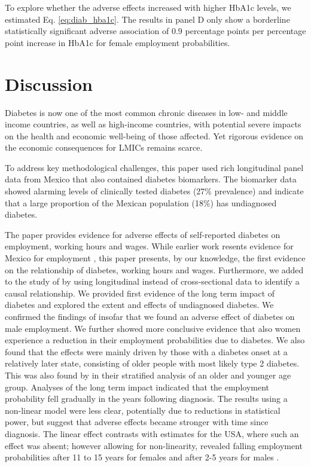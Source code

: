 \documentclass[12pt,english]{article}
\begin{document}
To explore whether the adverse effects increased with higher \ac{HbA1c} levels, we estimated Eq. \ref{eq:diab_hba1c}. The results in panel D only show a borderline statistically significant adverse association of 0.9 percentage points per percentage point increase in \ac{HbA1c} for female employment probabilities.


\FloatBarrier
	
\section{\label{sec:cha_4_conclusion}Discussion}

Diabetes is now one of the most common chronic diseases in low- and middle income countries, as well as high-income countries, with potential severe impacts on the health and economic well-being of those affected.  Yet rigorous evidence on the economic consequences for \acp{LMIC} remains scarce.

To address key methodological challenges, this paper used rich longitudinal panel data from Mexico that also contained diabetes biomarkers. The biomarker data showed alarming levels of clinically tested diabetes (27\% prevalence) and indicate that a large proportion of the Mexican population (18\%) has undiagnosed diabetes.

The paper provides evidence for adverse effects of self-reported diabetes on employment, working hours and wages. While earlier work resents evidence for Mexico for employment \parencite{Seuring2015}, this paper presents, by our knowledge, the first evidence on the relationship of diabetes, working hours and wages. Furthermore, we added to the study of \textcite{Seuring2015} by using longitudinal instead of cross-sectional data to identify a causal relationship. We provided first evidence of the long term impact of diabetes and explored the extent and effects of undiagnosed diabetes. We confirmed the findings of \textcite{Seuring2015} insofar that we found an adverse effect of diabetes on male employment. We further showed more conclusive evidence that also women experience a reduction in their employment probabilities due to diabetes. We also found that the effects were mainly driven by those with a diabetes onset at a relatively later state, consisting of older people with most likely type 2 diabetes. This was also found by \textcite{Seuring2015} in their stratified analysis of an older and younger age group. Analyses of the long term impact indicated that the employment probability fell gradually in the years following diagnosis. The results using a non-linear model were less clear, potentially due to reductions in statistical power, but suggest that adverse effects became stronger with time since diagnosis. The linear effect contrasts with estimates for the USA, where such an effect was absent; however allowing for non-linearity, revealed falling employment probabilities after 11 to 15 years for females and after 2-5 years for males \parencite{Minor2013}.
\end{document}
